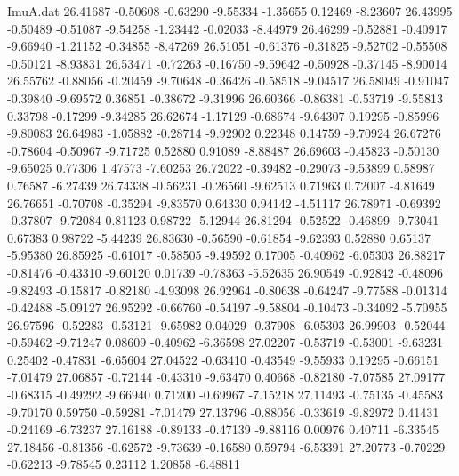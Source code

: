 \begin{filecontents}{ImuA.dat}
  26.41687   -0.50608   -0.63290   -9.55334   -1.35655    0.12469   -8.23607
  26.43995   -0.50489   -0.51087   -9.54258   -1.23442   -0.02033   -8.44979
  26.46299   -0.52881   -0.40917   -9.66940   -1.21152   -0.34855   -8.47269
  26.51051   -0.61376   -0.31825   -9.52702   -0.55508   -0.50121   -8.93831
  26.53471   -0.72263   -0.16750   -9.59642   -0.50928   -0.37145   -8.90014
  26.55762   -0.88056   -0.20459   -9.70648   -0.36426   -0.58518   -9.04517
  26.58049   -0.91047   -0.39840   -9.69572    0.36851   -0.38672   -9.31996
  26.60366   -0.86381   -0.53719   -9.55813    0.33798   -0.17299   -9.34285
  26.62674   -1.17129   -0.68674   -9.64307    0.19295   -0.85996   -9.80083
  26.64983   -1.05882   -0.28714   -9.92902    0.22348    0.14759   -9.70924
  26.67276   -0.78604   -0.50967   -9.71725    0.52880    0.91089   -8.88487
  26.69603   -0.45823   -0.50130   -9.65025    0.77306    1.47573   -7.60253
  26.72022   -0.39482   -0.29073   -9.53899    0.58987    0.76587   -6.27439
  26.74338   -0.56231   -0.26560   -9.62513    0.71963    0.72007   -4.81649
  26.76651   -0.70708   -0.35294   -9.83570    0.64330    0.94142   -4.51117
  26.78971   -0.69392   -0.37807   -9.72084    0.81123    0.98722   -5.12944
  26.81294   -0.52522   -0.46899   -9.73041    0.67383    0.98722   -5.44239
  26.83630   -0.56590   -0.61854   -9.62393    0.52880    0.65137   -5.95380
  26.85925   -0.61017   -0.58505   -9.49592    0.17005   -0.40962   -6.05303
  26.88217   -0.81476   -0.43310   -9.60120    0.01739   -0.78363   -5.52635
  26.90549   -0.92842   -0.48096   -9.82493   -0.15817   -0.82180   -4.93098
  26.92964   -0.80638   -0.64247   -9.77588   -0.01314   -0.42488   -5.09127
  26.95292   -0.66760   -0.54197   -9.58804   -0.10473   -0.34092   -5.70955
  26.97596   -0.52283   -0.53121   -9.65982    0.04029   -0.37908   -6.05303
  26.99903   -0.52044   -0.59462   -9.71247    0.08609   -0.40962   -6.36598
  27.02207   -0.53719   -0.53001   -9.63231    0.25402   -0.47831   -6.65604
  27.04522   -0.63410   -0.43549   -9.55933    0.19295   -0.66151   -7.01479
  27.06857   -0.72144   -0.43310   -9.63470    0.40668   -0.82180   -7.07585
  27.09177   -0.68315   -0.49292   -9.66940    0.71200   -0.69967   -7.15218
  27.11493   -0.75135   -0.45583   -9.70170    0.59750   -0.59281   -7.01479
  27.13796   -0.88056   -0.33619   -9.82972    0.41431   -0.24169   -6.73237
  27.16188   -0.89133   -0.47139   -9.88116    0.00976    0.40711   -6.33545
  27.18456   -0.81356   -0.62572   -9.73639   -0.16580    0.59794   -6.53391
  27.20773   -0.70229   -0.62213   -9.78545    0.23112    1.20858   -6.48811

\end{filecontents}
